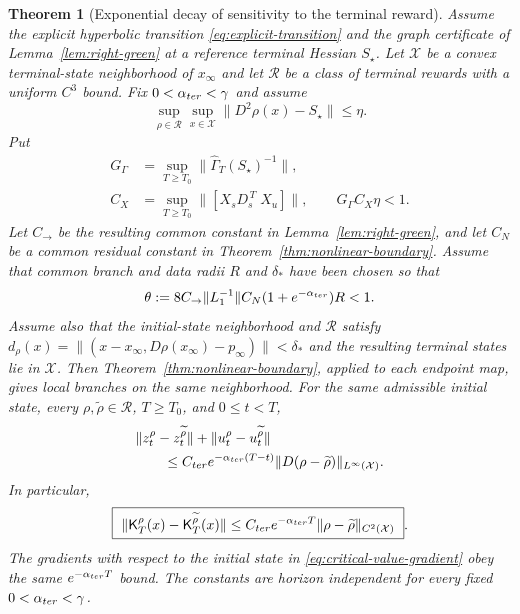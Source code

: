 \documentclass[twocolumn,nameyear,amsthm]{autart}
\newcommand{\Kfb}{\mathsf K}
\newcommand{\xinf}{x_\infty}
\newcommand{\pinf}{p_\infty}
\numberwithin{equation}{section}
\newtheorem{theorem}{Theorem}[section]
\begin{document}
\begin{theorem}[Exponential decay of sensitivity to the terminal reward]
\label{thm:terminal-reward}
Assume the explicit hyperbolic transition \eqref{eq:explicit-transition} and
the graph certificate of Lemma~\ref{lem:right-green} at a reference terminal
Hessian $S_\star$.  Let $\mathcal X$ be a convex terminal-state neighborhood
of $\xinf$ and let
$\mathscr R$ be a class of terminal rewards with a uniform $C^3$ bound.  Fix
$0<\alpha_{\rm ter}<\gamma$ and assume
\begin{equation}\label{eq:terminal-reward-class}
 \sup_{\rho\in\mathscr R}\sup_{x\in\mathcal X}
 \|D^2\rho(x)-S_\star\|\le\eta .
\end{equation}
Put
\[
 \begin{aligned}
 G_\Gamma&=\sup_{T\ge T_0}\|\widehat\Gamma_T(S_\star)^{-1}\|,\\
 C_X&=\sup_{T\ge T_0}\|[X_sD_s^{\,T}\;X_u]\|,
 \qquad G_\Gamma C_X\eta<1.
 \end{aligned}
\]
Let $C_{\to}$ be the resulting common constant in
Lemma~\ref{lem:right-green}, and let $C_N$ be a common residual constant in
Theorem~\ref{thm:nonlinear-boundary}.  Assume that common branch and data radii
$R$ and $\delta_*$ have been chosen so that
\begin{equation}\label{eq:terminal-absorption}
 \theta:=8C_{\to}\|L_1^{-1}\|C_N(1+e^{-\alpha_{\rm ter}})R<1 .
\end{equation}
Assume also that the initial-state neighborhood and $\mathscr R$ satisfy
$d_\rho(x)=\|(x-\xinf,D\rho(\xinf)-\pinf)\|<\delta_*$ and the resulting
terminal states lie in $\mathcal X$.  Then
Theorem~\ref{thm:nonlinear-boundary}, applied to each endpoint map, gives local
branches on the same neighborhood.  For the same admissible initial state,
every $\rho,\widetilde\rho\in
\mathscr R$, $T\ge T_0$, and $0\le t<T$,
\begin{align}
 &\|z_t^\rho-z_t^{\widetilde\rho}\|
 +\|u_t^\rho-u_t^{\widetilde\rho}\|\nonumber\\
 &\qquad\le C_{\rm ter}e^{-\alpha_{\rm ter}(T-t)}
 \|D(\rho-\widetilde\rho)\|_{L^\infty(\mathcal X)} .
 \label{eq:terminal-trajectory-attenuation}
\end{align}
In particular,
\begin{equation}\label{eq:terminal-policy-attenuation}
 \boxed{\ \|\Kfb_T^\rho(x)-\Kfb_T^{\widetilde\rho}(x)\|
 \le C_{\rm ter}e^{-\alpha_{\rm ter}T}
 \|\rho-\widetilde\rho\|_{C^2(\mathcal X)}\ } .
\end{equation}
The gradients with respect to the initial state in
\eqref{eq:critical-value-gradient} obey the same
$e^{-\alpha_{\rm ter}T}$ bound.  The constants are horizon independent
for every fixed $0<\alpha_{\rm ter}<\gamma$.
\end{theorem}
\end{document}
